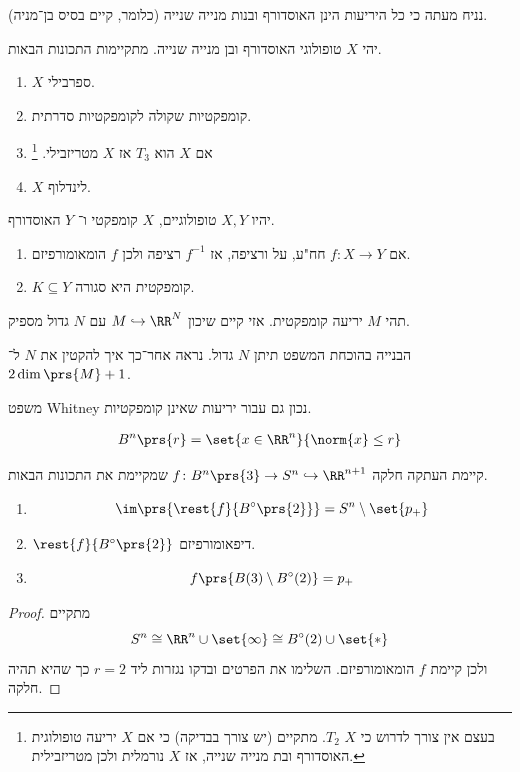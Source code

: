 \documentclass[a4paper,10pt,twoside,openany]{book}
\begin{document}
נניח מעתה כי כל היריעות הינן האוסדורף ובנות מנייה שנייה (כלומר, קיים בסיס בן־מניה).

\begin{exercise}
יהי
$X$
טופולוגי האוסדורף ובן מנייה שנייה.
מתקיימות התכונות הבאות.

\begin{enumerate}
\item
$X$
ספרבילי.
\item
קומפקטיות שקולה לקומפקטיות סדרתית.
\item אם
$X$
הוא
$T_3$
אז
$X$
מטריזבילי.%
\footnote{בעצם אין צורך לדרוש כי
$X$
$T_2$.
מתקיים (יש צורך בבדיקה) כי אם
$X$
יריעה טופולוגית האוסדורף ובת מנייה שנייה, אז
$X$
נורמלית ולכן מטריזבילית.}
\item
$X$
לינדלוף.
\end{enumerate}
\end{exercise}
\begin{exercise}
יהיו
$X,Y$
טופולוגיים,
$X$
קומפקטי ו־%
$Y$
האוסדורף.
\begin{enumerate}
\item אם
$f \colon X \to Y$
חח"ע, על ורציפה, אז
$f^{-1}$
רציפה ולכן
$f$
הומאומורפיזם.
\item
$K \subseteq Y$
קומפקטית היא
סגורה.
\end{enumerate}
\end{exercise}
\begin{theorem}
תהי
$M$
יריעה קומפקטית. אזי קיים שיכון
$M \hookrightarrow \RR^N$
עם
$N$
גדול מספיק.
\end{theorem}
\begin{remark}
הבנייה בהוכחת המשפט תיתן
$N$
גדול. נראה אחר־כך איך להקטין את
$N$
ל־%
$2\dim\prs{M} + 1$.
\end{remark}
\begin{remark}
משפט
\textenglish{Whitney}
נכון גם עבור יריעות שאינן קומפקטיות.
\end{remark}
\begin{notation}
\begin{align*}
B^n\prs{r} = \set{x \in \RR^n}{\norm{x} \leq r}
\end{align*}
\end{notation}
\begin{lemma}
קיימת העתקה חלקה
$f \colon B^n\prs{3} \to S^n \hookrightarrow \RR^{n+1}$
שמקיימת את התכונות הבאות.
\begin{enumerate}
\item \[\im\prs{\rest{f}{B^{\circ}\prs{2}}} = S^n \setminus \set{p_+}\]

\item $\rest{f}{B^{\circ}\prs{2}}$
דיפאומורפיזם.

\item \[f\prs{B(3) \setminus B^{\circ}(2)} = p_+\]

\end{enumerate}
\end{lemma}
\begin{proof}
מתקיים
\[S^n \cong \RR^n \cup \set{\infty} \cong B^{\circ}(2) \cup \set{*}\]
ולכן קיימת
$f$
הומאומורפיזם.
השלימו את הפרטים ובדקו נגזרות ליד
$r=2$
כך שהיא תהיה חלקה.
\end{proof}
\end{document}
